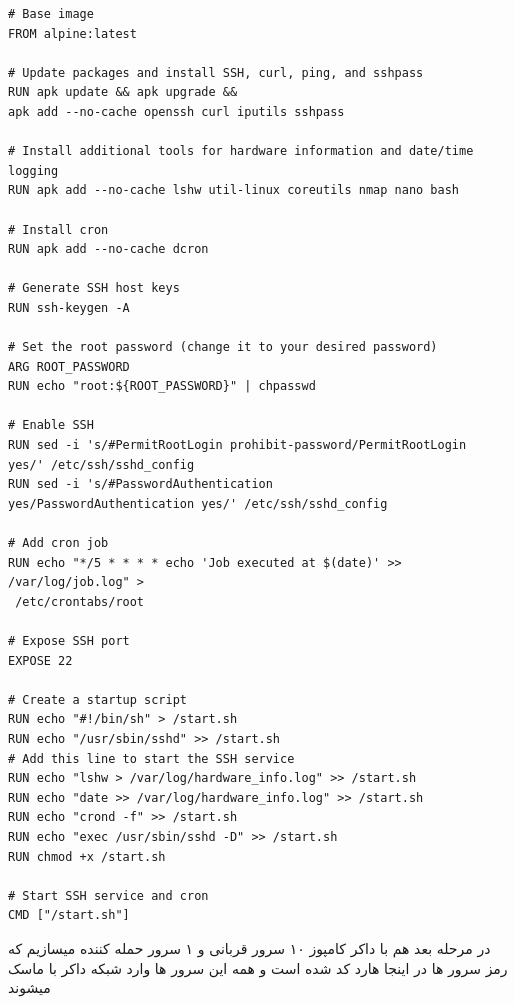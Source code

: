\documentclass{article}
\begin{document}
\begin{latin}
  \begin{lstlisting}
# Base image
FROM alpine:latest

# Update packages and install SSH, curl, ping, and sshpass
RUN apk update && apk upgrade && 
apk add --no-cache openssh curl iputils sshpass

# Install additional tools for hardware information and date/time logging
RUN apk add --no-cache lshw util-linux coreutils nmap nano bash

# Install cron
RUN apk add --no-cache dcron

# Generate SSH host keys
RUN ssh-keygen -A

# Set the root password (change it to your desired password)
ARG ROOT_PASSWORD
RUN echo "root:${ROOT_PASSWORD}" | chpasswd

# Enable SSH
RUN sed -i 's/#PermitRootLogin prohibit-password/PermitRootLogin 
yes/' /etc/ssh/sshd_config
RUN sed -i 's/#PasswordAuthentication 
yes/PasswordAuthentication yes/' /etc/ssh/sshd_config

# Add cron job
RUN echo "*/5 * * * * echo 'Job executed at $(date)' >> /var/log/job.log" >
 /etc/crontabs/root

# Expose SSH port
EXPOSE 22

# Create a startup script
RUN echo "#!/bin/sh" > /start.sh
RUN echo "/usr/sbin/sshd" >> /start.sh  
# Add this line to start the SSH service
RUN echo "lshw > /var/log/hardware_info.log" >> /start.sh
RUN echo "date >> /var/log/hardware_info.log" >> /start.sh
RUN echo "crond -f" >> /start.sh
RUN echo "exec /usr/sbin/sshd -D" >> /start.sh
RUN chmod +x /start.sh

# Start SSH service and cron
CMD ["/start.sh"]
  \end{lstlisting}
\end{latin}
در مرحله بعد هم با داکر کامپوز ۱۰ سرور قربانی و ۱ سرور حمله کننده میسازیم که رمز سرور ها در اینجا هارد کد شده است و همه این سرور ها وارد شبکه داکر با ماسک  میشوند
\end{document}
